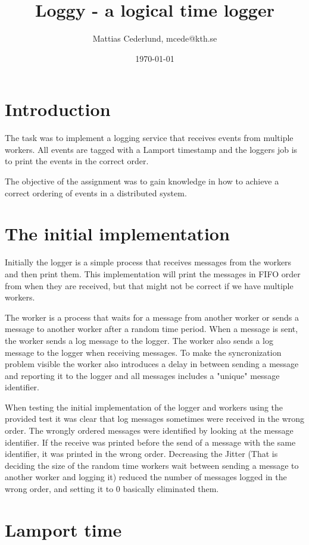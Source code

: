 \documentclass[a4paper, 11pt]{article}
\title{Loggy - a logical time logger}
\author{Mattias Cederlund, mcede@kth.se}
\date{\today{}}
\begin{document}
\maketitle

\section{Introduction}

The task was to implement a logging service that receives events from multiple workers. All events are tagged with a Lamport timestamp and the loggers job is to print the events in the correct order.

The objective of the assignment was to gain knowledge in how to achieve a correct ordering of events in a distributed system.

\section{The initial implementation}

Initially the logger is a simple process that receives messages from the workers and then print them. This implementation will print the messages in FIFO order from when they are received, but that might not be correct if we have multiple workers. 

The worker is a process that waits for a message from another worker or sends a message to another worker after a random time period. When a message is sent, the worker sends a log message to the logger. The worker also sends a log message to the logger when receiving messages. To make the syncronization problem visible the worker also introduces a delay in between sending a message and reporting it to the logger and all messages includes a "unique" message identifier.

When testing the initial implementation of the logger and workers using the provided test it was clear that log messages sometimes were received in the wrong order. The wrongly ordered messages were identified by looking at the message identifier. If the receive was printed before the send of a message with the same identifier, it was printed in the wrong order. Decreasing the Jitter (That is deciding the size of the random time workers wait between sending a message to another worker and logging it) reduced the number of messages logged in the wrong order, and setting it to 0 basically eliminated them.

\section{Lamport time}
\end{document}

